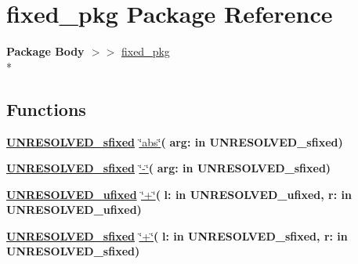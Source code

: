 \hypertarget{classfixed__pkg}{}\section{fixed\+\_\+pkg Package Reference}
\label{classfixed__pkg}
{\bfseries Package Body $>$$>$ }\hyperlink{class__fixed__pkg}{fixed\+\_\+pkg}\\*
\subsection*{Functions}
 \begin{DoxyCompactItemize}
\item 
{\bfseries {\bfseries {\bfseries \hyperlink{classfixed__pkg_aa723b28a027c3c0f9bca02d75e8df4d6}{U\+N\+R\+E\+S\+O\+L\+V\+E\+D\+\_\+sfixed}} \textcolor{vhdlchar}{ }}} \hyperlink{classfixed__pkg_a38c1c4c6b1f76cfc07b009c92acabab5}{\char`\"{}abs\char`\"{}}{\bfseries  ( }{\bfseries \textcolor{vhdlchar}{arg\+: }\textcolor{stringliteral}{in }\textcolor{vhdlchar}{U\+N\+R\+E\+S\+O\+L\+V\+E\+D\+\_\+sfixed}}{\bfseries  )} 
\item 
{\bfseries {\bfseries {\bfseries \hyperlink{classfixed__pkg_aa723b28a027c3c0f9bca02d75e8df4d6}{U\+N\+R\+E\+S\+O\+L\+V\+E\+D\+\_\+sfixed}} \textcolor{vhdlchar}{ }}} \hyperlink{classfixed__pkg_acc47f8e7fbecebc0fc011d8431f076fd}{\char`\"{}-\/\char`\"{}}{\bfseries  ( }{\bfseries \textcolor{vhdlchar}{arg\+: }\textcolor{stringliteral}{in }\textcolor{vhdlchar}{U\+N\+R\+E\+S\+O\+L\+V\+E\+D\+\_\+sfixed}}{\bfseries  )} 
\item 
{\bfseries {\bfseries {\bfseries \hyperlink{classfixed__pkg_ae78bc2b36d22f6abeac163955e8a587d}{U\+N\+R\+E\+S\+O\+L\+V\+E\+D\+\_\+ufixed}} \textcolor{vhdlchar}{ }}} \hyperlink{classfixed__pkg_a758fadb06ceaaaffa80aa4473dc8dcda}{\char`\"{}+\char`\"{}}{\bfseries  ( }{\bfseries \textcolor{vhdlchar}{l\+: }\textcolor{stringliteral}{in }\textcolor{vhdlchar}{U\+N\+R\+E\+S\+O\+L\+V\+E\+D\+\_\+ufixed}}{\bfseries  , \textcolor{vhdlchar}{r\+: }\textcolor{stringliteral}{in }\textcolor{vhdlchar}{U\+N\+R\+E\+S\+O\+L\+V\+E\+D\+\_\+ufixed}}{\bfseries  )} 
\item 
{\bfseries {\bfseries {\bfseries \hyperlink{classfixed__pkg_aa723b28a027c3c0f9bca02d75e8df4d6}{U\+N\+R\+E\+S\+O\+L\+V\+E\+D\+\_\+sfixed}} \textcolor{vhdlchar}{ }}} \hyperlink{classfixed__pkg_a75f813bcb278832108d6fa67eccdfc1c}{\char`\"{}+\char`\"{}}{\bfseries  ( }{\bfseries \textcolor{vhdlchar}{l\+: }\textcolor{stringliteral}{in }\textcolor{vhdlchar}{U\+N\+R\+E\+S\+O\+L\+V\+E\+D\+\_\+sfixed}}{\bfseries  , \textcolor{vhdlchar}{r\+: }\textcolor{stringliteral}{in }\textcolor{vhdlchar}{U\+N\+R\+E\+S\+O\+L\+V\+E\+D\+\_\+sfixed}}{\bfseries  )} 

\end{DoxyCompactItemize}
